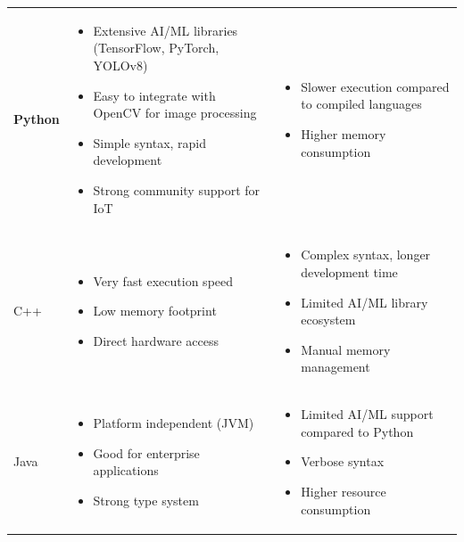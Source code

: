 \documentclass[a4paper]{article}
\begin{document}
\begin{longtable}{@{}
    >{\raggedright\arraybackslash}p{}
    >{\raggedright\arraybackslash}p{}
    >{\raggedright\arraybackslash}p{} @{}}
    \textbf{Python} & 
    \begin{itemize}[leftmargin=*, nosep, topsep=0pt]
        \item Extensive AI/ML libraries (TensorFlow, PyTorch, YOLOv8)
        \item Easy to integrate with OpenCV for image processing
        \item Simple syntax, rapid development
        \item Strong community support for IoT
    \end{itemize} & 
    \begin{itemize}[leftmargin=*, nosep, topsep=0pt]
        \item Slower execution compared to compiled languages
        \item Higher memory consumption
    \end{itemize} \\
    \addlinespace
    \midrule
    \addlinespace
    C++ & 
    \begin{itemize}[leftmargin=*, nosep, topsep=0pt]
        \item Very fast execution speed
        \item Low memory footprint
        \item Direct hardware access
    \end{itemize} & 
    \begin{itemize}[leftmargin=*, nosep, topsep=0pt]
        \item Complex syntax, longer development time
        \item Limited AI/ML library ecosystem
        \item Manual memory management
    \end{itemize} \\
    \addlinespace
    \midrule
    \addlinespace
    Java & 
    \begin{itemize}[leftmargin=*, nosep, topsep=0pt]
        \item Platform independent (JVM)
        \item Good for enterprise applications
        \item Strong type system
    \end{itemize} & 
    \begin{itemize}[leftmargin=*, nosep, topsep=0pt]
        \item Limited AI/ML support compared to Python
        \item Verbose syntax
        \item Higher resource consumption
    \end{itemize} \\
\end{longtable}
\end{document}

